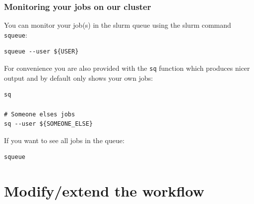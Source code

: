 \subsubsection{Monitoring your jobs on our cluster}

\begin{note}
You can monitor your job(s) in the slurm queue using the slurm command \texttt{squeue}:

\begin{lstlisting}
squeue --user ${USER}
\end{lstlisting}

For convenience you are also provided with the \texttt{sq} function which produces nicer output and by default only shows your own jobs:

\begin{lstlisting}
sq

# Someone elses jobs
sq --user ${SOMEONE_ELSE}
\end{lstlisting}

If you want to see all jobs in the queue:

\begin{lstlisting}
squeue
\end{lstlisting}

\end{note}


\section{Modify/extend the workflow}

